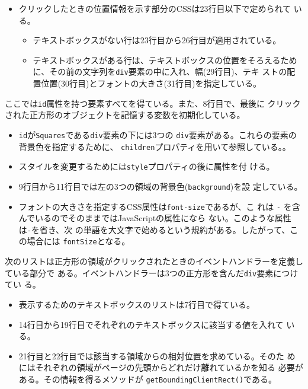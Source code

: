 \begin{Exec}
\begin{itemize}
 \item クリックしたときの位置情報を示す部分のCSSは23行目以下で定められて
       いる。
 \begin{itemize}
  \item テキストボックスがない行は23行目から26行目が適用されている。
  \item テキストボックスがある行は、テキストボックスの位置をそろえるため
	に、その前の文字列を\texttt{div}要素の中に入れ、幅(29行目)、テキ
	ストの配置位置(30行目)とフォントの大きさ(31行目)を指定している。
 \end{itemize}
\end{itemize}
ここでは\texttt{id}属性を持つ要素すべてを得ている。また、8行目で、最後に
 クリックされた正方形のオブジェクトを記憶する変数を初期化している。
\begin{itemize}
 \item \texttt{id}が\texttt{Squares}である\texttt{div}要素の下には3つの
 \texttt{div}要素がある。これらの要素の背景色を指定するために、
 \texttt{children}プロパティを用いて参照している。。
 \item スタイルを変更するためには\texttt{style}プロパティの後に属性を付
       ける。
 \item 9行目から11行目では左の3つの領域の背景色(\texttt{background})を設
       定している。
 \item フォントの大きさを指定するCSS属性は\texttt{font-size}であるが、こ
       れは \texttt{-} を含んでいるのでそのままではJavaScriptの属性になら
       ない。このような属性は\texttt{-}を省き、次
       の単語を大文字で始めるという規約がある。したがって、この場合には
       \texttt{fontSize}となる。
\end{itemize}

次のリストは正方形の領域がクリックされたときのイベントハンドラーを定義している部分で
 ある。イベントハンドラーは3つの正方形を含んだ\texttt{div}要素につけてい
 る。
\begin{itemize}
 \item 表示するためのテキストボックスのリストは7行目で得ている。
 \item 14行目から19行目でそれぞれのテキストボックスに該当する値を入れて
       いる。
 \item 21行目と22行目では該当する領域からの相対位置を求めている。そのた
       めにはそれぞれの領域がページの先頭からどれだけ離れているかを知る
       必要がある。その情報を得るメソッドが
       \texttt{getBoundingClientRect()}である。


\end{itemize}
\end{Exec}
